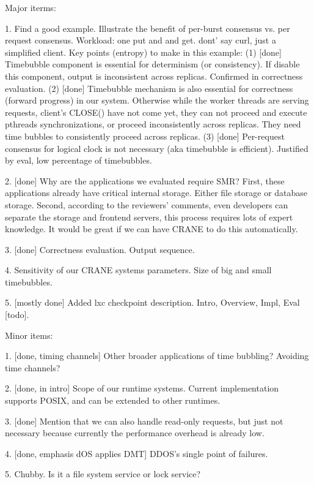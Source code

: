 Major iterms:

1. Find a good example. Illustrate the benefit of per-burst consensus vs. per 
request consensus. Workload: one put and and get. dont' say curl, just a 
simplified client.
  Key points (entropy) to make in this example:
  (1) [done] Timebubble component is essential for determinism (or 
consistency). If disable this component, output is inconsistent across 
replicas. Confirmed in correctness evaluation.
  (2) [done] Timebubble mechanism is also essential for correctness (forward 
progress) in our system. Otherwise while the worker threads are serving 
requests, client's CLOSE() have not come yet, they can not proceed and execute 
pthreads synchronizations, or proceed inconsistently across replicas. They need 
time bubbles to consistently proceed across replicas.
  (3) [done] Per-request consensus for logical clock is not necessary (aka 
timebubble is efficient). Justified by eval, low percentage of timebubbles. 
  


2. [done] Why are the applications we evaluated require SMR? First, these 
applications 
already have critical internal storage. Either file storage or database 
storage. Second, according to the reviewers' comments, even developers can 
separate the storage and frontend servers, this process requires lots of expert 
knowledge. It would be great if we can have CRANE to do this automatically.

3. [done] Correctness evaluation. Output sequence.

4. Sensitivity of our CRANE systems parameters. Size of big and small 
timebubbles.

5. [mostly done] Added lxc checkpoint description. Intro, Overview, Impl, Eval 
[todo].


Minor items:

1. [done, timing channels] Other broader applications of time bubbling? 
Avoiding time channels?

2. [done, in intro] Scope of our runtime systems. Current implementation 
supports POSIX, and can be extended to other runtimes.

3. [done] Mention that we can also handle read-only requests, but just not 
necessary 
because currently the performance overhead is already low.

4. [done, emphasis dOS applies DMT] DDOS's single point of failures.

5. Chubby. Is it a file system service or lock service?

